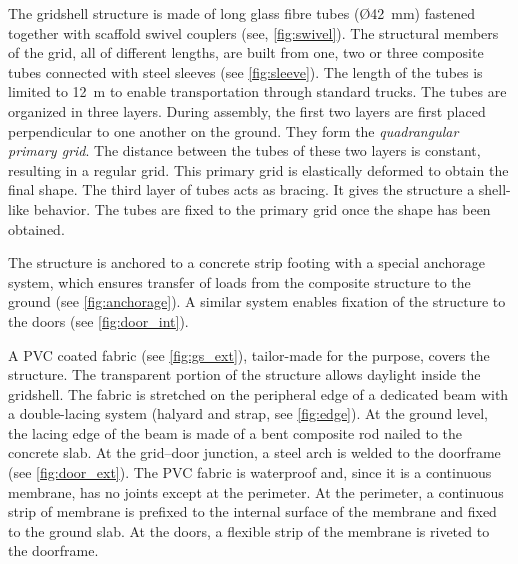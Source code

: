 The gridshell structure is made of long glass fibre tubes (\O 42~mm) fastened together with scaffold swivel couplers (see, \cref{fig:swivel}). The structural members of the grid, all of different lengths, are built  from one, two or three composite tubes connected with steel sleeves (see \cref{fig:sleeve}). The length of the tubes is limited to 12~m to enable transportation through standard trucks. The tubes are organized in three layers. During assembly, the first two layers are first placed perpendicular to one another on the ground. They form the \emph{quadrangular primary grid}. The distance between the tubes of these two layers is constant, resulting in a regular grid. This primary grid is elastically deformed to obtain the final shape. The third layer of tubes acts as bracing. It gives the structure a shell-like behavior. The tubes are fixed to the primary grid once the shape has been obtained.

The structure is anchored to a concrete strip footing with a special anchorage system, which ensures transfer of loads from the composite structure to the ground (see \cref{fig:anchorage}). A similar system enables fixation of the structure to the doors (see \cref{fig:door_int}).

A PVC coated fabric (see \cref{fig:gs_ext}), tailor-made for the purpose, covers the structure. The transparent portion of the structure allows daylight inside the gridshell. The fabric is stretched on the peripheral edge of a dedicated beam with a double-lacing system (halyard and strap, see \cref{fig:edge}). At the ground level, the lacing edge of the beam is made of a bent composite rod nailed to the concrete slab. At the grid–door junction, a steel arch is welded to the doorframe (see \cref{fig:door_ext}). The PVC fabric is waterproof and, since it is a continuous membrane, has no joints except at the perimeter. At the perimeter, a continuous strip of membrane is prefixed to the internal surface of the membrane and fixed to the ground slab. At the doors, a flexible strip of the membrane is riveted to the doorframe.




